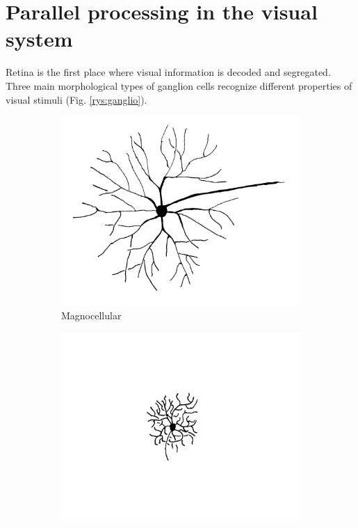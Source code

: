 \documentclass{pracalicmgr}
\begin{document}
   \section{Parallel processing in the visual system}
   Retina is the first place where visual information is decoded and segregated. Three main morphological types of ganglion cells recognize different properties of visual stimuli (Fig. \ref{rys:ganglio}).
   
   \begin{figure}[H]
   	\begin{subfigure}{.33\textwidth}
   		\centering
   		\includegraphics[width=1.\linewidth]{cell_M2.png}
   		\caption{Magnocellular}
   		\label{rys:magno}
   	\end{subfigure}%
   	\begin{subfigure}{.33\textwidth}
   		\centering
   		\includegraphics[width=1\linewidth]{cell_P2.png}

\end{subfigure}
\end{figure}
\end{document}

